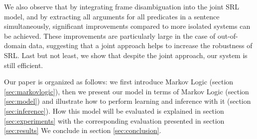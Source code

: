 
We also observe that by integrating frame disambiguation into the
joint SRL model, and by extracting all arguments for all predicates in a
sentence simultaneously, significant improvements compared to more isolated systems can be achieved. These improvements are particularly large in
the case of out-of-domain data, suggesting that a joint approach helps
to increase the robustness of SRL.
Last but not least, we show that despite the joint approach, our
system is still efficient. 

Our paper is organized as follows: we first introduce Markov Logic (section
\ref{sec:markovlogic}),
then we present our model in terms of Markov Logic (section \ref{sec:model}) and illustrate how to perform learning and inference with it (section \ref{sec:inference}). How this model
will be evaluated is explained in section \ref{sec:experiments} with the corresponding
evaluation presented in section \ref{sec:results} We conclude in section
\ref{sec:conclusion}.



